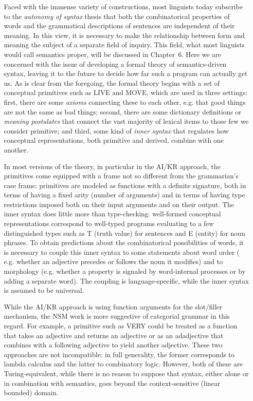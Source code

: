 Faced with the immense variety of constructions, most linguists today
subscribe to the {\it autonomy of syntax} thesis that both the combinatorical
properties of words and the grammatical descriptions of sentences are
independent of their meaning. In this view, it is necessary to make the
relationship between form and meaning the subject of a separate field of
inquiry. This field, what most linguists would call semantics proper, will be
discussed in Chapter~6. Here we are concerned with the issue of developing a
formal theory of semantics-driven syntax, leaving it to the future to decide
how far such a program can actually get us. As is clear from the foregoing,
the formal theory begins with a set of conceptual primitives such as LIVE and
MOVE, which are used in three settings: first, there are some {\it axioms}
connecting these to each other, e.g. that good things are not the same as bad
things; second, there are some dictionary definitions or {\it meaning
postulates} that connect the vast majority of lexical items to those few we
consider primitive; and third, some kind of {\it inner syntax} that regulates
how conceptual representations, both primitive and derived, combine with one
another. 

In most versions of the theory, in particular in the AI/KR approach, the
primitives come equipped with a frame not so different from the grammarian's
case frame: primitives are modeled as functions with a definite signature,
both in terms of having a fixed arity (number of arguments) and in terms of
having type restrictions imposed both on their input arguments and on their
output. The inner syntax does little more than type-checking: well-formed
conceptual representations correspond to well-typed programs evaluating to a
few distinguished types such as T (truth value) for sentences and E (entity)
for noun phrases. To obtain predictions about the combinatorical possibilities
of words, it is necessary to couple this inner syntax to some statements about
word order ( e.g. whether an adjective precedes or follows the noun it
modifies) and to morphology (e.g. whether a property is signaled by
word-internal processes or by adding a separate word). The coupling is
language-specific, while the inner syntax is assumed to be universal.

While the AI/KR approach is using function arguments for the slot/filler
mechanism, the NSM work is more suggestive of categorial grammar in this
regard. For example, a primitive such as VERY could be treated as a function
that takes an adjective and returns an adjective or as an adadjective that
combines with a following adjective to yield another adjective. These two
approaches are not incompatible: in full generality, the former corresponds to
lambda calculus and the latter to combinatory logic. However, both of these
are Turing-equivalent, while there is no reason to suppose that syntax, either
alone or in combination with semantics, goes beyond the context-sensitive
(linear bounded) domain.

